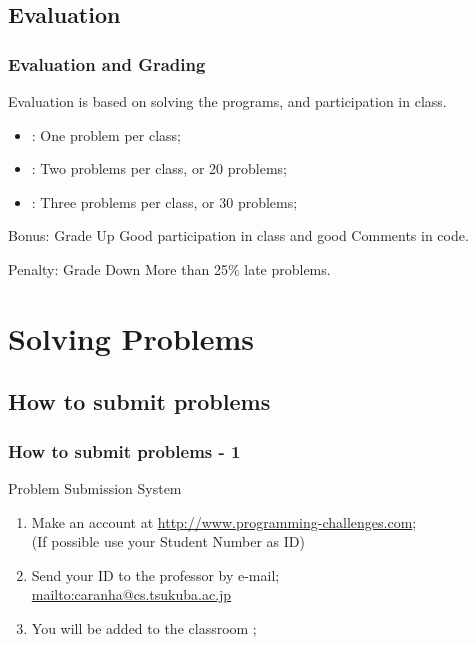 \documentclass{beamer}
\begin{document}
\subsection{Evaluation}
\begin{frame}
  \frametitle{Evaluation and Grading}
  \begin{center}
    Evaluation is based on solving the programs, and participation in class.
  \end{center}
  \begin{itemize}
  \item {}: One problem per class;
  \item {}: Two problems per class, or 20 problems;
  \item {}: Three problems per class, or 30 problems;
  \end{itemize}
  \medskip
  \begin{block}{Bonus: Grade Up}
    Good participation in class and good Comments in code.
  \end{block}
  \begin{block}{Penalty: Grade Down}
    More than 25\% late problems.
  \end{block}
\end{frame}

\section{Solving Problems}
\subsection{How to submit problems}
\begin{frame}
  \frametitle{How to submit problems - 1}

  \begin{block}{Problem Submission System}
    \begin{enumerate}
      \item Make an account at \url{http://www.programming-challenges.com};\\ 
        {\small (If possible use your Student Number as ID)}
      \item Send your ID to the professor by e-mail;\\
        {\small \url{mailto:caranha@cs.tsukuba.ac.jp}}
      \item You will be added to the classroom
        ;        
    \end{enumerate}
  \end{block}
\end{frame}
\end{document}
